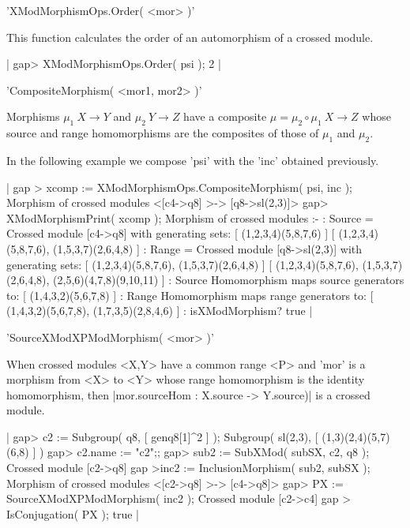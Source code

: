 %

'XModMorphismOps.Order( <mor> )'

This function calculates the order of an automorphism of a crossed module.

|    gap> XModMorphismOps.Order( psi );
    2   |

%

'CompositeMorphism( <mor1, mor2> )'

Morphisms  $\mu_1 \: X \to Y$  and  $\mu_2 \: Y \to Z$
have a composite  $\mu = \mu_2 \circ \mu_1 \: X \to Z$
whose source and range homomorphisms are the composites of those
of  $\mu_1$  and  $\mu_2$.

In the following example we compose 'psi' with the 'inc' obtained previously.

|    gap > xcomp := XModMorphismOps.CompositeMorphism( psi, inc );
    Morphism of crossed modules <[c4->q8] >-> [q8->sl(2,3)]> 
    gap> XModMorphismPrint( xcomp );
    Morphism of crossed modules :- 
    : Source = Crossed module [c4->q8] with generating sets:
      [ (1,2,3,4)(5,8,7,6) ]
      [ (1,2,3,4)(5,8,7,6), (1,5,3,7)(2,6,4,8) ]
    : Range = Crossed module [q8->sl(2,3)] with generating sets:
      [ (1,2,3,4)(5,8,7,6), (1,5,3,7)(2,6,4,8) ]
      [ (1,2,3,4)(5,8,7,6), (1,5,3,7)(2,6,4,8), (2,5,6)(4,7,8)(9,10,11) ]
    : Source Homomorphism maps source generators to:
      [ (1,4,3,2)(5,6,7,8) ]
    : Range Homomorphism maps range generators to:
      [ (1,4,3,2)(5,6,7,8), (1,7,3,5)(2,8,4,6) ]
    : isXModMorphism? true    |

%

'SourceXModXPModMorphism( <mor> )'

When crossed modules <X,Y> have a common range <P> and
'mor' is a morphism from <X> to <Y> whose range homomorphism
is the identity homomorphism, then  
|mor.sourceHom : X.source -> Y.source)|
is a crossed module.

|    gap> c2 := Subgroup( q8, [ genq8[1]^2 ] );
    Subgroup( sl(2,3), [ (1,3)(2,4)(5,7)(6,8) ] )
    gap> c2.name := "c2";;
    gap> sub2 := SubXMod( subSX, c2, q8 );
    Crossed module [c2->q8]
    gap >inc2 := InclusionMorphism( sub2, subSX );
    Morphism of crossed modules <[c2->q8] >-> [c4->q8]>
    gap> PX := SourceXModXPModMorphism( inc2 );
    Crossed module [c2->c4]
    gap > IsConjugation( PX );
    true   |

